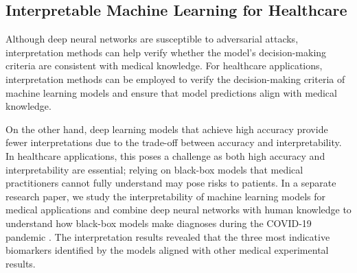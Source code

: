 \subsection{Interpretable Machine Learning for Healthcare}

Although deep neural networks are susceptible to adversarial attacks, interpretation methods can help verify whether the model's decision-making criteria are consistent with medical knowledge. For healthcare applications, interpretation methods can be employed to verify the decision-making criteria of machine learning models and ensure that model predictions align with medical knowledge.

On the other hand, deep learning models that achieve high accuracy provide fewer interpretations due to the trade-off between accuracy and interpretability. In healthcare applications, this poses a challenge as both high accuracy and interpretability are essential; relying on black-box models that medical practitioners cannot fully understand may pose risks to patients. In a separate research paper, we study the interpretability of machine learning models for medical applications and combine deep neural networks with human knowledge to understand how black-box models make diagnoses during the COVID-19 pandemic \citep{han2021interpret}. The interpretation results revealed that the three most indicative biomarkers identified by the models aligned with other medical experimental results.





